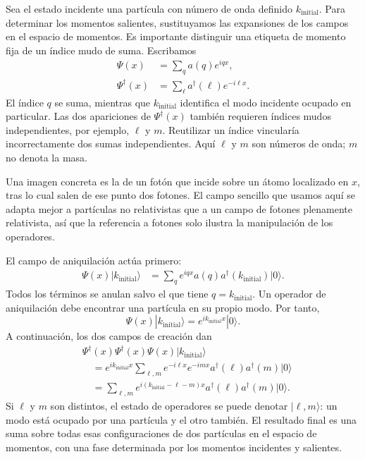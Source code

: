 Sea el estado incidente una partícula con número de onda definido \(k_{\mathrm{initial}}\). Para determinar los momentos salientes, sustituyamos las expansiones de los campos en el espacio de momentos. Es importante distinguir una etiqueta de momento fija de un índice mudo de suma. Escribamos
\begin{align}
\Psi(x)&=\sum_q a(q)e^{iqx},\\
\Psi^\dagger(x)&=\sum_\ell a^\dagger(\ell)e^{-i\ell x}.
\end{align}
El índice \(q\) se suma, mientras que \(k_{\mathrm{initial}}\) identifica el modo incidente ocupado en particular. Las dos apariciones de \(\Psi^\dagger(x)\) también requieren índices mudos independientes, por ejemplo, \(\ell\) y \(m\). Reutilizar un índice vincularía incorrectamente dos sumas independientes. Aquí \(\ell\) y \(m\) son números de onda; \(m\) no denota la masa.

Una imagen concreta es la de un fotón que incide sobre un átomo localizado en \(x\), tras lo cual salen de ese punto dos fotones. El campo sencillo que usamos aquí se adapta mejor a partículas no relativistas que a un campo de fotones plenamente relativista, así que la referencia a fotones solo ilustra la manipulación de los operadores.

El campo de aniquilación actúa primero:
\begin{align}
\Psi(x)|k_{\mathrm{initial}}\rangle
&=\sum_q e^{iqx}a(q)a^\dagger(k_{\mathrm{initial}})|0\rangle.
\end{align}
Todos los términos se anulan salvo el que tiene \(q=k_{\mathrm{initial}}\). Un operador de aniquilación debe encontrar una partícula en su propio modo. Por tanto,
\begin{equation}
\Psi(x)|k_{\mathrm{initial}}\rangle
=e^{ik_{\mathrm{initial}}x}|0\rangle.
\end{equation}
A continuación, los dos campos de creación dan
\begin{align}
&\Psi^\dagger(x)\Psi^\dagger(x)\Psi(x)
|k_{\mathrm{initial}}\rangle
\\
&\quad=
e^{ik_{\mathrm{initial}}x}
\sum_{\ell,m}
e^{-i\ell x}e^{-imx}
a^\dagger(\ell)a^\dagger(m)|0\rangle
\\
&\quad=
\sum_{\ell,m}
e^{i(k_{\mathrm{initial}}-\ell-m)x}
a^\dagger(\ell)a^\dagger(m)|0\rangle.
\end{align}
Si \(\ell\) y \(m\) son distintos, el estado de operadores se puede denotar \(|\ell,m\rangle\): un modo está ocupado por una partícula y el otro también. El resultado final es una suma sobre todas esas configuraciones de dos partículas en el espacio de momentos, con una fase determinada por los momentos incidentes y salientes.


